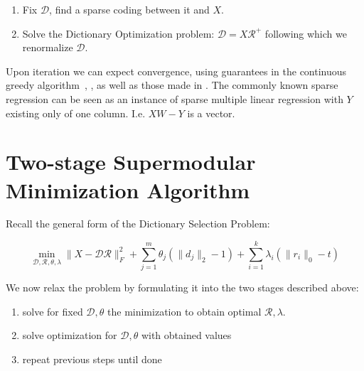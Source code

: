 \documentclass{article}
\newcommand{\Rr}{\mathcal{R}}
\newcommand{\D}{\mathcal{D}}
\begin{document}
\begin{enumerate}
\item Fix $\D$, find a sparse coding between it and $X$.
\item Solve the Dictionary Optimization problem: $\D = X\Rr^{+}$ following which we renormalize $\D$.
\end{enumerate}
Upon iteration we can expect convergence, using guarantees in the continuous greedy algorithm~\cite{greedy_selection}, \cite{submod_spectral}, \cite{submod_sparsecoding} as well as those made in \cite{weaklyalpha}. The commonly known sparse regression can be seen as an instance of sparse multiple linear regression with $Y$ existing only of one column. I.e. $XW-Y$ is a vector. 

\section{Two-stage Supermodular Minimization Algorithm}\label{sec:algorithm}

Recall the general form of the Dictionary Selection Problem:

$$\min_{\D, \Rr, \theta, \lambda} \|X  -\D\Rr\|_F^2 + \sum_{j=1}^m \theta_j (\| d_j\|_2 - 1)+ \sum_{i=1}^k \lambda_i (\| r_i \|_0 - t)$$

\noindent We now relax the problem by formulating it into the two stages described above:
\begin{enumerate}
\item solve for fixed $\D, \theta$ the minimization to obtain optimal $\Rr, \lambda$.
\item solve optimization for $\D, \theta$ with obtained values
\item repeat previous steps until done
\end{enumerate}
\end{document}
